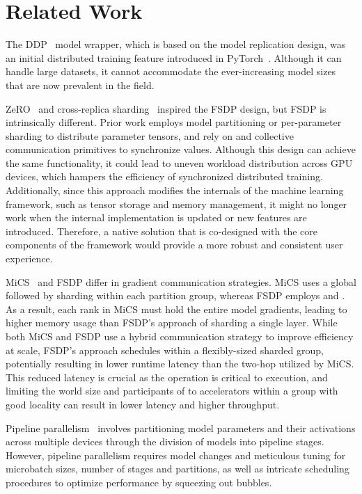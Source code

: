 \section{Related Work}\label{sec:related}

The DDP~\cite{ddp} model wrapper, which is based on the model replication design, was an initial distributed training feature introduced in PyTorch~\cite{pytorch:nips:2019}. Although it can handle large datasets, it cannot accommodate the ever-increasing model sizes that are now prevalent in the field.

ZeRO~\cite{zero, zero:offload} and cross-replica sharding~\cite{xu2020automatic} inspired the FSDP design, but FSDP is intrinsically different. Prior work employs model partitioning or per-parameter sharding to distribute parameter tensors, and rely on  and  collective communication primitives to synchronize values. Although this design can achieve the same functionality, it could lead to uneven workload distribution across GPU devices, which hampers the efficiency of synchronized distributed training. Additionally, since this approach modifies the internals of the machine learning framework, such as tensor storage and memory management, it might no longer work when the internal implementation is updated or new features are introduced. Therefore, a native solution that is co-designed with the core components of the framework would provide a more robust and consistent user experience.


MiCS~\cite{zhang2022mics} and FSDP differ in gradient communication strategies. MiCS uses a global  followed by sharding within each partition group, whereas FSDP employs  and . As a result, each rank in MiCS must hold the entire model gradients, leading to higher memory usage than FSDP's approach of sharding a single layer. While both MiCS and FSDP use a hybrid communication strategy to improve efficiency at scale, FSDP's approach schedules  within a flexibly-sized sharded group, potentially resulting in lower runtime latency than the two-hop  utilized by MiCS. This reduced latency is crucial as the  operation is critical to execution, and limiting the world size and participants of  to accelerators within a group with good locality can result in lower latency and higher throughput.

Pipeline parallelism~\cite{gpipe, harlap2018pipedream} involves partitioning model parameters and their activations across multiple devices through the division of models into pipeline stages. However, pipeline parallelism requires model changes and meticulous tuning for microbatch sizes, number of stages and partitions, as well as intricate scheduling procedures to optimize performance by squeezing out bubbles. 

